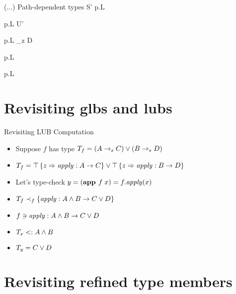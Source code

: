 \documentclass{beamer}
\begin{document}
\begin{frame}[fragile]{(...) Path-dependent types}
      {\Gamma \ts S' \sub p.L}

      {\Gamma \ts p.L \sub U'}

      {\Gamma \ts p.L \expand_z \seq D}

      {\Gamma \ts p.L \wf}

      {\Gamma \ts p.L \wf}
\end{frame}

\section{Revisiting glbs and lubs}

\begin{frame}[fragile]{Revisiting LUB Computation}
\begin{itemize}
\item Suppose $f$ has type ${T_f} = {(A\rightarrow_sC)} \vee {(B\rightarrow_sD)}$
\item $T_f = {\top \left\{z \Rightarrow \mathit{apply} : A \rightarrow C \right\}} \vee {\top\left\{z \Rightarrow \mathit{apply} : B \rightarrow D \right\}}$
\item Let's type-check $y = (\textbf{app }f\;x) = f.\mathit{apply}(x)$
\item $T_f \prec_f \{\mathit{apply} : A \wedge B \rightarrow C \vee D\}$
\item $f \ni {\mathit{apply} : A \wedge B \rightarrow C \vee D}$
\item $T_x <: A \wedge B$
\item $T_y = C \vee D$
\end{itemize}
\end{frame}

\section{Revisiting refined type members}
\end{document}
